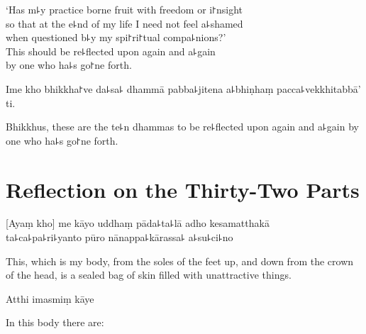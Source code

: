 \begin{english}
  `Has m꜕y practice borne fruit with freedom or i꜓nsight\\
  so that at the e꜕nd of my life I need not feel a꜕shamed\\
  when questioned b꜕y my spi꜓ri꜓tual compa꜕nions?'\\
  This should be re꜕flected upon again and a꜕gain\\
  by one who ha꜕s go꜓ne forth.
\end{english}

Ime kho bhikkha꜓ve da꜕sa꜕ dhammā pabba꜕jitena a꜕bhiṇhaṃ pacca꜕vekkhitabbā' ti.

\begin{english}
  Bhikkhus, these are the te꜕n dhammas to be re꜕flected upon again and a꜕gain by one who ha꜕s go꜓ne forth.
\end{english}

\chapter[Thirty-Two Parts]{Reflection on the Thirty-Two Parts}%


\begin{leader}
\end{leader}

[Ayaṃ kho] me kāyo uddhaṃ pāda꜕ta꜕lā adho kesamatthakā\\
ta꜕ca꜕pa꜕ri꜕yanto pūro nānappa꜕kārassa꜕ a꜕su꜕ci꜕no

\begin{english}
  This, which is my body, from the soles of the feet up, and down from the crown of the head, is a sealed bag of skin filled with unattractive things.
\end{english}

Atthi imasmiṃ kāye

\begin{english}
  In this body there are:
\end{english}

